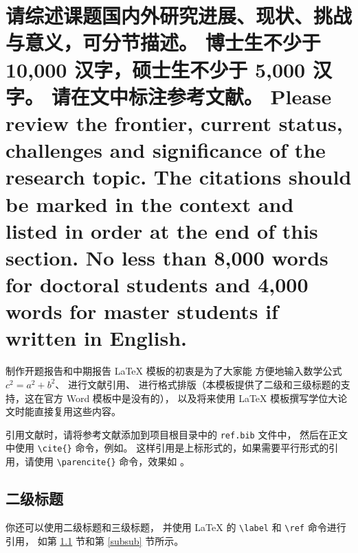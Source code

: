 \documentclass[a4paper,zihao=-4,AutoFakeBold]{ctexart}
\begin{document}

\vspace{-\parskip}
\section{请综述课题国内外研究进展、现状、挑战与意义，可分节描述。
    博士生不少于 10,000 汉字，硕士生不少于 5,000 汉字。
    请在文中标注参考文献。 
    Please review the frontier, current status, 
    challenges and significance of the research topic. 
    The citations should be marked in the context 
    and listed in order at the end of this section. 
    No less than 8,000 words for doctoral students 
    and 4,000 words for master students if written in English.}


制作开题报告和中期报告 \LaTeX{} 模板的初衷是为了大家能
方便地输入数学公式 $c^2 = a^2 + b^2$、
进行文献引用\cite{ZJSD}、
进行格式排版（本模板提供了二级和三级标题的支持，这在官方 Word 模板中是没有的），
以及将来使用 \LaTeX{} 模板撰写学位大论文时能直接复用这些内容。


引用文献时，请将参考文献添加到项目根目录中的 \texttt{ref.bib} 文件中，
然后在正文中使用 \verb|\cite{}| 命令，例如\cite{SPDZ}。
这样引用是上标形式的，如果需要平行形式的引用，请使用
\verb|\parencite{}| 命令，效果如 \parencite{SPDZ}。


\subsection{二级标题}\label{sub}

你还可以使用二级标题和三级标题，
并使用 \LaTeX{} 的 \verb|\label| 和 \verb|\ref| 命令进行引用，
如第 \ref{sub} 节和第 \ref{subsub} 节所示。
\end{document}
